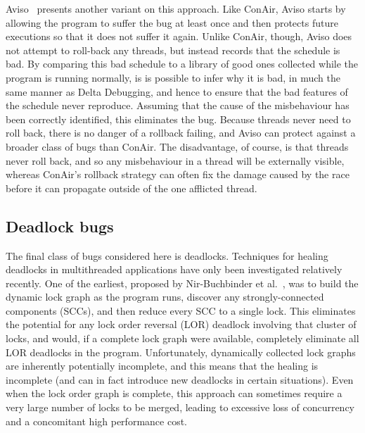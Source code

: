 Aviso~\cite{Lucia2013} presents another variant on this approach.
Like ConAir, Aviso starts by allowing the program to suffer the bug at
least once and then protects future executions so that it does not
suffer it again.  Unlike ConAir, though, Aviso does not attempt to
roll-back any threads, but instead records that the schedule is bad.
By comparing this bad schedule to a library of good ones collected
while the program is running normally, is is possible to infer why it
is bad, in much the same manner as Delta Debugging, and hence to
ensure that the bad features of the schedule never reproduce.
Assuming that the cause of the misbehaviour has been correctly
identified, this eliminates the bug.  Because threads never need to
roll back, there is no danger of a rollback failing, and Aviso can
protect against a broader class of bugs than ConAir.  The
disadvantage, of course, is that threads never roll back, and so any
misbehaviour in a thread will be externally visible, whereas ConAir's
rollback strategy can often fix the damage caused by the race before
it can propagate outside of the one afflicted thread.

\subsection{Deadlock bugs}
The final class of bugs considered here is deadlocks.  Techniques for
healing deadlocks in multithreaded applications have only been
investigated relatively recently.  One of the
earliest, proposed by Nir-Buchbinder et al.~\cite{Nir-Buchbinder2008},
was to build the dynamic lock graph as the program runs, discover any
strongly-connected components (SCCs), and then reduce every SCC to a
single lock.  This eliminates the potential for any lock order
reversal (LOR) deadlock involving that cluster of locks, and would, if
a complete lock graph were available, completely eliminate all LOR
deadlocks in the program.  Unfortunately, dynamically collected lock
graphs are inherently potentially incomplete, and this means that the
healing is incomplete (and can in fact introduce new deadlocks in
certain situations).  Even when the lock order graph is complete, this
approach can sometimes require a very large number of locks to be
merged, leading to excessive loss of concurrency and a concomitant
high performance cost.

